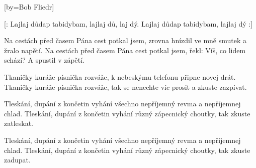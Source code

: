 [by={Bob Fliedr}]

\beginchorus{}
[: Lajlaj důdap tabidybam, lajlaj dů, laj dý.
Lajlaj důdap tabidybam, lajlaj dý :]
\endchorus{}

\beginverse{}
Na cestách před časem Pána cest potkal jsem,
zrovna hnízdil ve mně smutek a žralo napětí.
Na cestách před časem Pána cest potkal jsem,
řekl: Víš, co lidem schází? A spustil v zápětí.
\endverse{}

\beginchorus{}
\phantom{}
\endchorus{}

\beginverse{}
Tkaničky kuráže písnička rozváže,
k nebeskýmu telefonu připne novej drát. Tkaničky kuráže písnička rozváže,
tak se nenechte víc prosit a zkuste zazpívat.
\endverse{}

\beginchorus{}
\phantom{}
\endchorus{}

\beginverse{}
Tleskání, dupání z končetin vyhání
všechno nepříjemný revma a nepříjemnej chlad.
Tleskání, dupání z končetin vyhání
různý zápecnický choutky, tak zkuste zatleskat.
\endverse{}

\beginchorus{}
\phantom{}
\endchorus{}

\beginverse{}
Tleskání, dupání z končetin vyhání
všechno nepříjemný revma a nepříjemnej chlad.
Tleskání, dupání z končetin vyhání
různý zápecnický choutky, tak zkuste zadupat.
\endverse{}

\endsong{}
